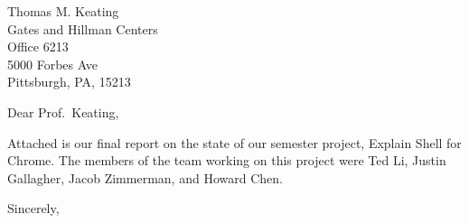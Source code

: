 \documentclass{letter}
\begin{document}
\begin{letter}{Thomas M. Keating\\
               Gates and Hillman Centers\\
               Office 6213\\
               5000 Forbes Ave\\
               Pittsburgh, PA, 15213}
\opening{Dear Prof.\ Keating,}

Attached is our final report on the state of our semester project, Explain Shell
for Chrome. The members of the team working on this project were Ted Li, Justin
Gallagher, Jacob Zimmerman, and Howard Chen.


\closing{Sincerely,}
\end{letter}
\end{document}
